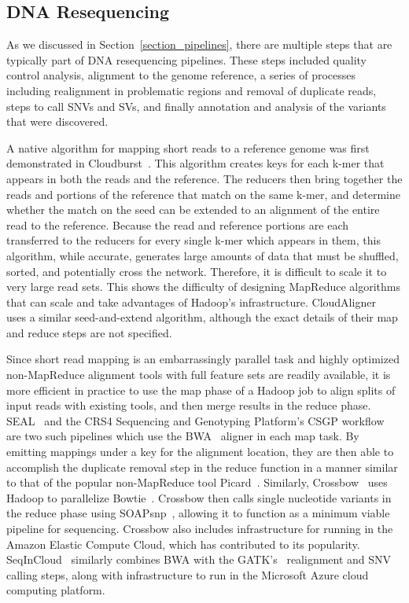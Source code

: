 \subsection{DNA Resequencing}

As we discussed in Section~\ref{section_pipelines}, there are multiple steps that are typically part of DNA resequencing pipelines. These steps included quality control analysis, alignment to the genome reference, a series of processes including realignment in problematic regions and removal of duplicate reads, steps to call SNVs and SVs, and finally annotation and analysis of the variants that were discovered. 

A native algorithm for mapping short reads to a reference genome was first demonstrated in Cloudburst~\cite{Schatz:2009p278}. This algorithm creates keys for each k-mer that appears in both the reads and the reference. The reducers then bring together the reads and portions of the reference that match on the same k-mer, and determine whether the match on the seed can be extended to an alignment of the entire read to the reference. Because the read and reference portions are each transferred to the reducers for every single k-mer which appears in them, this algorithm, while accurate, generates large amounts of data that must be shuffled, sorted, and potentially cross the network. Therefore, it is difficult to scale it to very large read sets. This shows the difficulty of designing MapReduce algorithms that can scale and take advantages of Hadoop's infrastructure. CloudAligner~\cite{Nguyen:2011p1832} uses a similar seed-and-extend algorithm, although the exact details of their map and reduce steps are not specified.

Since short read mapping is an embarrassingly parallel task and highly optimized non-MapReduce alignment tools with full feature sets are readily available, it is more efficient in practice to use the map phase of a Hadoop job to align splits of input reads with existing tools, and then merge results in the reduce phase. SEAL~\cite{Pireddu:2011fj} and the CRS4 Sequencing and Genotyping Platform's CSGP workflow~\cite{Pireddu:2011:MGS:1996092.1996106} are two such pipelines which use the BWA~\cite{Li:2009p836} aligner in each map task. By emitting mappings under a key for the alignment location, they are then able to accomplish the duplicate removal step in the reduce function in a manner similar to that of the popular non-MapReduce tool Picard~\cite{picard}. Similarly, Crossbow~\cite{Langmead:2009p1225} uses Hadoop to parallelize Bowtie~\cite{Langmead:2009p768}. Crossbow then calls single nucleotide variants in the reduce phase using SOAPsnp~\cite{Li:2009p1236}, allowing it to function as a minimum viable pipeline for sequencing. Crossbow also includes infrastructure for running in the Amazon Elastic Compute Cloud, which has contributed to its popularity. SeqInCloud~\cite{nabeel-bicob13-genome-analysis-cloud} similarly combines BWA with the GATK's~\cite{McKenna:2010p1051} realignment and SNV calling steps, along with infrastructure to run in the Microsoft Azure cloud computing platform.

